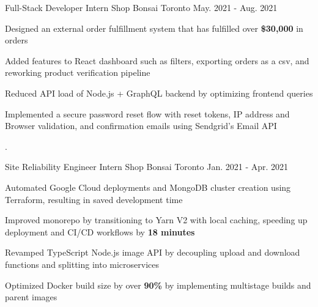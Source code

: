 

\begin{cventries}

  \cventry
    {Full-Stack Developer Intern} %
    {Shop Bonsai} %
    {Toronto} %
    {May. 2021 - Aug. 2021} %
    {
      \begin{cvitems} %
        \item {Designed an external order fulfillment system that has fulfilled over \textbf{\$30,000} in orders}
        \item {Added features to React dashboard such as filters, exporting orders as a csv, and reworking product verification pipeline}
        \item {Reduced API load of Node.js + GraphQL backend by optimizing frontend queries}
        \item {Implemented a secure password reset flow with reset tokens, IP address and Browser validation, and confirmation emails using Sendgrid's Email API}
      \end{cvitems}.
    }
    
  \cventry
    {Site Reliability Engineer Intern} %
    {Shop Bonsai} %
    {Toronto} %
    {Jan. 2021 - Apr. 2021} %
    {
      \begin{cvitems} %
        \item {Automated Google Cloud deployments and MongoDB cluster creation using Terraform, resulting in saved development time}
        \item {Improved monorepo by transitioning to Yarn V2 with local caching, speeding up deployment and CI/CD workflows by \textbf{18 minutes}}
        \item {Revamped TypeScript Node.js image API by decoupling upload and download functions and splitting into microservices}
        \item {Optimized Docker build size by over \textbf{90\%} by implementing multistage builds and parent images}
      \end{cvitems}
    }
    
\end{cventries}
